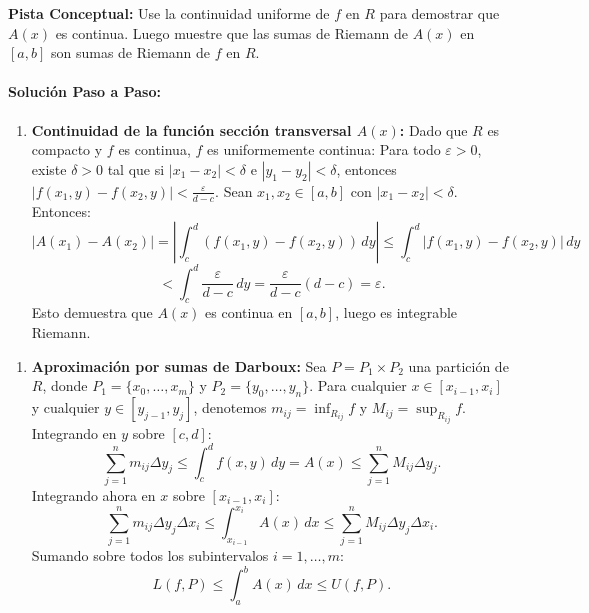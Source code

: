 \documentclass[11pt,a4paper]{article}
\begin{document}
\begin{tcolorbox}[colback=yellow!4,colframe=accentamber!70,arc=1mm,boxrule=0.5pt,left=3mm,right=3mm,top=1.5mm,bottom=1.5mm]
\textbf{Pista Conceptual:} Use la continuidad uniforme de $f$ en $R$ para demostrar que $A(x)$ es continua. Luego muestre que las sumas de Riemann de $A(x)$ en $[a,b]$ son sumas de Riemann de $f$ en $R$.
\end{tcolorbox}

\paragraph{Solución Paso a Paso:}\par
\begin{enumerate}[label=\textbf{\arabic*.}]
\item \textbf{Continuidad de la función sección transversal $A(x)$:}
Dado que $R$ es compacto y $f$ es continua, $f$ es uniformemente continua:
Para todo $\varepsilon > 0$, existe $\delta > 0$ tal que si $|x_1 - x_2| < \delta$ e $|y_1 - y_2| < \delta$, entonces $|f(x_1, y) - f(x_2, y)| < \frac{\varepsilon}{d - c}$.
Sean $x_1, x_2 \in [a,b]$ con $|x_1 - x_2| < \delta$. Entonces:
\begin{equation*}
|A(x_1) - A(x_2)| = \left| \int_c^d (f(x_1, y) - f(x_2, y)) \, dy \right| \le \int_c^d |f(x_1, y) - f(x_2, y)| \, dy
\end{equation*}
\begin{equation*}
< \int_c^d \frac{\varepsilon}{d - c} \, dy = \frac{\varepsilon}{d - c}(d - c) = \varepsilon.
\end{equation*}
Esto demuestra que $A(x)$ es continua en $[a,b]$, luego es integrable Riemann.
\end{enumerate}

\begin{enumerate}[label=\textbf{\arabic*.}]
\item \textbf{Aproximación por sumas de Darboux:}
Sea $P = P_1 \times P_2$ una partición de $R$, donde $P_1 = \{x_0, \dots, x_m\}$ y $P_2 = \{y_0, \dots, y_n\}$.
Para cualquier $x \in [x_{i-1}, x_i]$ y cualquier $y \in [y_{j-1}, y_j]$, denotemos $m_{ij} = \inf_{R_{ij}} f$ y $M_{ij} = \sup_{R_{ij}} f$.
Integrando en $y$ sobre $[c,d]$:
\begin{equation*}
\sum_{j=1}^n m_{ij} \Delta y_j \le \int_c^d f(x,y) \, dy = A(x) \le \sum_{j=1}^n M_{ij} \Delta y_j.
\end{equation*}
Integrando ahora en $x$ sobre $[x_{i-1}, x_i]$:
\begin{equation*}
\sum_{j=1}^n m_{ij} \Delta y_j \Delta x_i \le \int_{x_{i-1}}^{x_i} A(x) \, dx \le \sum_{j=1}^n M_{ij} \Delta y_j \Delta x_i.
\end{equation*}
Sumando sobre todos los subintervalos $i = 1, \dots, m$:
\begin{equation*}
L(f, P) \le \int_a^b A(x) \, dx \le U(f, P).
\end{equation*}
\end{enumerate}
\end{document}

